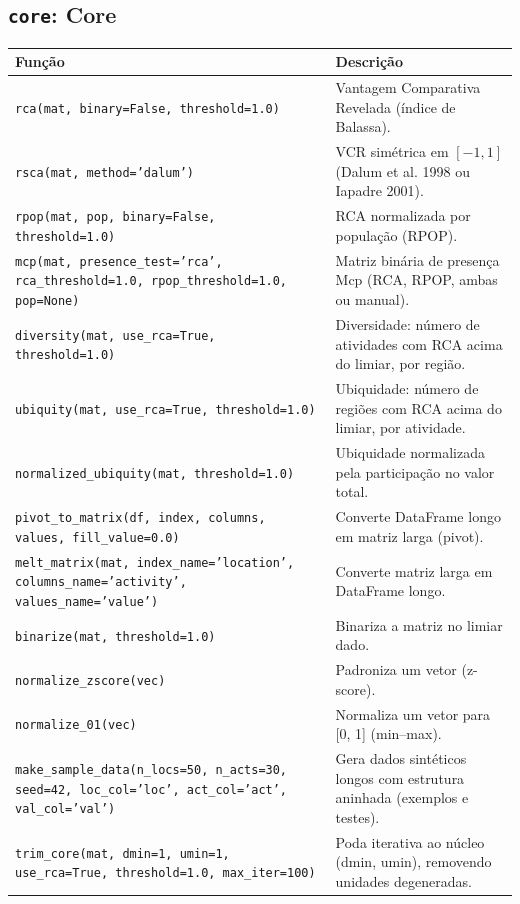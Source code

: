 \subsection{\texttt{core}: Core}
\begin{longtable}{>{\raggedright\arraybackslash}p{9.2cm} >{\raggedright\arraybackslash}p{7.0cm}}
\toprule
\textbf{Fun\c{c}\~{a}o} & \textbf{Descri\c{c}\~{a}o} \\
\midrule\endhead
\texttt{\footnotesize rca(mat, binary=False, threshold=1.0)} & {\small Vantagem Comparativa Revelada (\'{i}ndice de Balassa).} \\[2pt]
\texttt{\footnotesize rsca(mat, method='dalum')} & {\small VCR sim\'{e}trica em $[-1, 1]$ (Dalum et al. 1998 ou Iapadre 2001).} \\[2pt]
\texttt{\footnotesize rpop(mat, pop, binary=False, threshold=1.0)} & {\small RCA normalizada por popula\c{c}\~{a}o (RPOP).} \\[2pt]
\texttt{\footnotesize mcp(mat, presence\_test='rca', rca\_threshold=1.0, rpop\_threshold=1.0, pop=None)} & {\small Matriz bin\'{a}ria de presen\c{c}a Mcp (RCA, RPOP, ambas ou manual).} \\[2pt]
\texttt{\footnotesize diversity(mat, use\_rca=True, threshold=1.0)} & {\small Diversidade: n\'{u}mero de atividades com RCA acima do limiar, por regi\~{a}o.} \\[2pt]
\texttt{\footnotesize ubiquity(mat, use\_rca=True, threshold=1.0)} & {\small Ubiquidade: n\'{u}mero de regi\~{o}es com RCA acima do limiar, por atividade.} \\[2pt]
\texttt{\footnotesize normalized\_ubiquity(mat, threshold=1.0)} & {\small Ubiquidade normalizada pela participa\c{c}\~{a}o no valor total.} \\[2pt]
\texttt{\footnotesize pivot\_to\_matrix(df, index, columns, values, fill\_value=0.0)} & {\small Converte DataFrame longo em matriz larga (pivot).} \\[2pt]
\texttt{\footnotesize melt\_matrix(mat, index\_name='location', columns\_name='activity', values\_name='value')} & {\small Converte matriz larga em DataFrame longo.} \\[2pt]
\texttt{\footnotesize binarize(mat, threshold=1.0)} & {\small Binariza a matriz no limiar dado.} \\[2pt]
\texttt{\footnotesize normalize\_zscore(vec)} & {\small Padroniza um vetor (z-score).} \\[2pt]
\texttt{\footnotesize normalize\_01(vec)} & {\small Normaliza um vetor para [0, 1] (min--max).} \\[2pt]
\texttt{\footnotesize make\_sample\_data(n\_locs=50, n\_acts=30, seed=42, loc\_col='loc', act\_col='act', val\_col='val')} & {\small Gera dados sint\'{e}ticos longos com estrutura aninhada (exemplos e testes).} \\[2pt]
\texttt{\footnotesize trim\_core(mat, dmin=1, umin=1, use\_rca=True, threshold=1.0, max\_iter=100)} & {\small Poda iterativa ao n\'{u}cleo (dmin, umin), removendo unidades degeneradas.} \\[2pt]
\bottomrule
\end{longtable}

